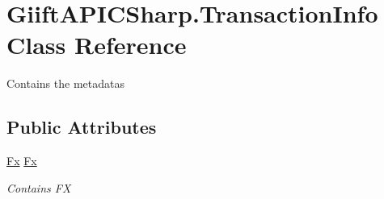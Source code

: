 \hypertarget{class_giift_a_p_i_c_sharp_1_1_transaction_info}{}\section{Giift\+A\+P\+I\+C\+Sharp.\+Transaction\+Info Class Reference}
\label{class_giift_a_p_i_c_sharp_1_1_transaction_info}


Contains the metadatas  


\subsection*{Public Attributes}
\begin{DoxyCompactItemize}
\item 
\hyperlink{class_giift_a_p_i_c_sharp_1_1_fx}{Fx} \hyperlink{class_giift_a_p_i_c_sharp_1_1_transaction_info_ad06b9186a125211e11fa7a6f90314c17}{Fx}
\begin{DoxyCompactList}\small\item\em Contains FX \end{DoxyCompactList}\end{DoxyCompactItemize}
